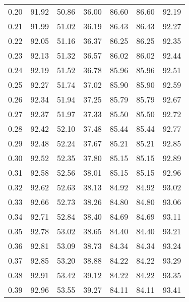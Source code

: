 \begin{tabular}{|c|c|c|c|c|c|c|}
      0.20 &     91.92 &     50.86 &      36.00 &   86.60 &      86.60 &         92.19 \\
      0.21 &     91.99 &     51.02 &      36.19 &   86.43 &      86.43 &         92.27 \\
      0.22 &     92.05 &     51.16 &      36.37 &   86.25 &      86.25 &         92.35 \\
      0.23 &     92.13 &     51.32 &      36.57 &   86.02 &      86.02 &         92.44 \\
      0.24 &     92.19 &     51.52 &      36.78 &   85.96 &      85.96 &         92.51 \\
      0.25 &     92.27 &     51.74 &      37.02 &   85.90 &      85.90 &         92.59 \\
      0.26 &     92.34 &     51.94 &      37.25 &   85.79 &      85.79 &         92.67 \\
      0.27 &     92.37 &     51.97 &      37.33 &   85.50 &      85.50 &         92.72 \\
      0.28 &     92.42 &     52.10 &      37.48 &   85.44 &      85.44 &         92.77 \\
      0.29 &     92.48 &     52.24 &      37.67 &   85.21 &      85.21 &         92.85 \\
      0.30 &     92.52 &     52.35 &      37.80 &   85.15 &      85.15 &         92.89 \\
      0.31 &     92.58 &     52.56 &      38.01 &   85.15 &      85.15 &         92.96 \\
      0.32 &     92.62 &     52.63 &      38.13 &   84.92 &      84.92 &         93.02 \\
      0.33 &     92.66 &     52.73 &      38.26 &   84.80 &      84.80 &         93.06 \\
      0.34 &     92.71 &     52.84 &      38.40 &   84.69 &      84.69 &         93.11 \\
      0.35 &     92.78 &     53.02 &      38.65 &   84.40 &      84.40 &         93.21 \\
      0.36 &     92.81 &     53.09 &      38.73 &   84.34 &      84.34 &         93.24 \\
      0.37 &     92.85 &     53.20 &      38.88 &   84.22 &      84.22 &         93.29 \\
      0.38 &     92.91 &     53.42 &      39.12 &   84.22 &      84.22 &         93.35 \\
      0.39 &     92.96 &     53.55 &      39.27 &   84.11 &      84.11 &         93.41 \\

\end{tabular}
